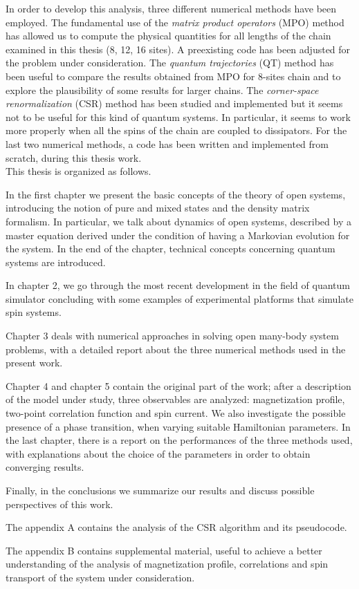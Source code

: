 In order to develop this analysis, three different numerical methods have been employed.  The fundamental use of the \emph{matrix product operators} (MPO) method has allowed us to compute the physical quantities for all lengths of the chain examined in this thesis (8, 12, 16 sites). A preexisting code has been adjusted for the problem under consideration. The \emph{quantum trajectories} (QT) method has been useful to compare the results obtained from MPO for 8-sites chain and to explore the plausibility of some results for larger chains. The \emph{corner-space renormalization} (CSR) method has been studied and implemented but it seems not to be useful for this kind of quantum systems. In particular, it seems to work more properly when all the spins of the chain are coupled to dissipators. For the last two numerical methods, a code has been written and implemented from scratch, during this thesis work.
\\


This thesis is organized as follows. 

In the first chapter we present the basic concepts of the theory of open systems, introducing the notion of pure and mixed states and the density matrix formalism. In particular, we talk about dynamics of open systems, described by a master equation derived under the condition of having a Markovian evolution for the system. In the end of the chapter, technical concepts concerning quantum systems are introduced. 

In chapter 2, we go through the most recent development in the field of quantum simulator concluding with some examples of experimental platforms that simulate spin systems. 

Chapter 3 deals with numerical approaches in solving open many-body system problems, with a detailed report about the three numerical methods used in the present work. 

Chapter 4 and chapter 5 contain the original part of the work; after a description of the model under study, three observables are analyzed: magnetization profile, two-point correlation function and spin current. We also investigate the possible presence of a phase transition, when varying suitable Hamiltonian parameters. In the last chapter, there is a report on the performances of the three methods used, with explanations about the choice of the parameters in order to obtain converging results.

Finally, in the conclusions we summarize our results and discuss possible perspectives of this work.

The appendix A contains the analysis of the CSR algorithm and its pseudocode.

The appendix B contains supplemental material, useful to achieve a better understanding of the analysis of magnetization profile, correlations and spin transport of the system under consideration.